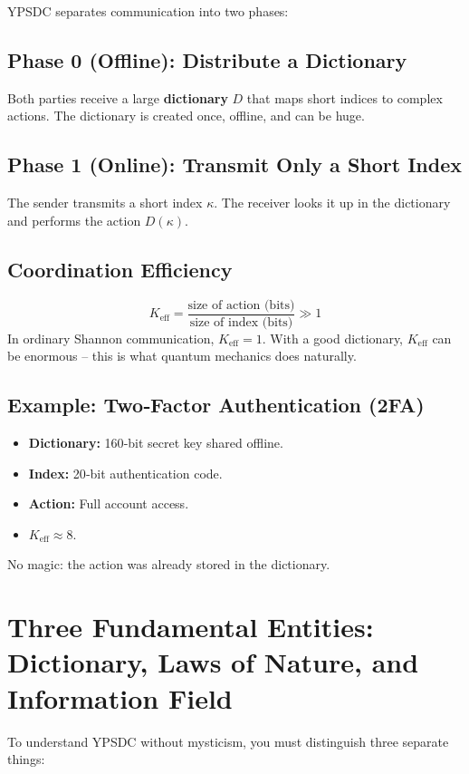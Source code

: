 \documentclass[12pt,a4paper]{article}
\begin{document}
	YPSDC separates communication into two phases:
	
	\subsection{Phase 0 (Offline): Distribute a Dictionary}
	Both parties receive a large \textbf{dictionary} \(D\) that maps short indices to complex actions. The dictionary is created once, offline, and can be huge.
	
	\subsection{Phase 1 (Online): Transmit Only a Short Index}
	The sender transmits a short index \(\kappa\). The receiver looks it up in the dictionary and performs the action \(D(\kappa)\).
	
	\subsection{Coordination Efficiency}
	\[
	K_{\mathrm{eff}} = \frac{\text{size of action (bits)}}{\text{size of index (bits)}} \gg 1
	\]
	In ordinary Shannon communication, \(K_{\mathrm{eff}}=1\). With a good dictionary, \(K_{\mathrm{eff}}\) can be enormous -- this is what quantum mechanics does naturally.
	
	\subsection{Example: Two‑Factor Authentication (2FA)}
	\begin{itemize}
		\item \textbf{Dictionary:} 160‑bit secret key shared offline.
		\item \textbf{Index:} 20‑bit authentication code.
		\item \textbf{Action:} Full account access.
		\item \(K_{\mathrm{eff}} \approx 8\).
	\end{itemize}
	No magic: the action was already stored in the dictionary.
	
	\section{Three Fundamental Entities: Dictionary, Laws of Nature, and Information Field}
	
	To understand YPSDC without mysticism, you must distinguish three separate things:
	
\end{document}
